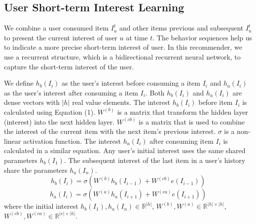 \documentclass[runningheads]{llncs}
\begin{document}
\subsection{User Short-term Interest Learning}
We combine a user consumed item $I_{u}^{t}$ and other items previous and subsequent $I_{u}^{t}$ to present the current interest of user $u$ at time $t$. The behavior sequences help us to indicate a more precise short-term interest of user. In this recommender, we use a recurrent structure, which is a bidirectional recurrent neural network, to capture the short-term interest of the user.

We define $h_{b}(I_{i})$ as the user's interest before consuming a item $I_{i}$ and $h_{a}(I_{i})$ as the user's interest after consuming a item $I_{i}$. Both $h_{b}(I_{i})$ and $h_{a}(I_{i})$ are dense vectors with $|h|$ real value elements. The interest $h_{b}(I_{i})$ before item $I_{i}$ is calculated using Equation (1). $W^{(b)}$ is a matrix that transform the hidden layer (interest) into the next hidden layer. $W^{(cb)}$ is a matrix that is used to combine the interest of the current item with the next item's previous interest. $\sigma $ is a non-linear activation function. The interest $h_{a}(I_{i})$ after consuming item $I_{i}$ is calculated in a similar equation. Any user's initial interest uses the same shared parameters $h_{b}(I_{1})$. The subsequent interest of the last item in a user's history share the parameters $h_{a}(I_{n})$.
\begin{equation}
h_{b}(I_{i})=\sigma (W^{(b)}h_{b}(I_{i-1})+W^{(cb)}e(I_{i-1}))
\end{equation}
\begin{equation}
h_{a}(I_{i})=\sigma (W^{(a)}h_{a}(I_{i+1})+W^{(ca)}e(I_{i+1}))
\end{equation}
where the initial interest $h_{b}(I_{1}),h_{a}(I_{n})\in \mathbb{R}^{|h|}$, $W^{(b)},W^{(a)}\in \mathbb{R}^{|h|\times |h|}$, $W^{(cb)},W^{(ca)}\in \mathbb{R}^{|e|\times |h|}$.
\end{document}
